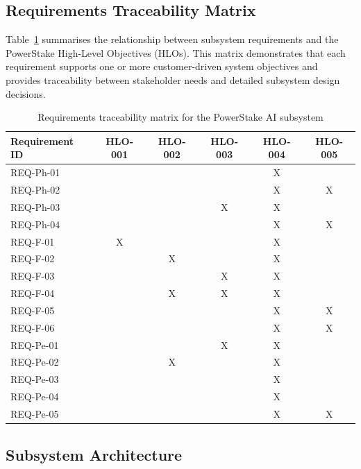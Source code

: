 \documentclass[11pt, twoside, a4paper]{article}
\begin{document}
\subsection{Requirements Traceability Matrix}

Table~\ref{tab:traceability} summarises the relationship between subsystem requirements and the PowerStake High-Level Objectives (HLOs). This matrix demonstrates that each requirement supports one or more customer-driven system objectives and provides traceability between stakeholder needs and detailed subsystem design decisions.

\begin{table}[H]
    \caption{Requirements traceability matrix for the PowerStake AI subsystem}
\centering
\renewcommand{\arraystretch}{1.15}
\begin{tabular}{|p{2.8cm}|c|c|c|c|c|}
\hline
\textbf{Requirement ID} & \textbf{HLO-001} & \textbf{HLO-002} & \textbf{HLO-003} & \textbf{HLO-004} & \textbf{HLO-005} \\ \hline
REQ-Ph-01 &  &  &  & X &  \\ \hline
REQ-Ph-02 &  &  &  & X & X \\ \hline
REQ-Ph-03 &  &  & X & X &  \\ \hline
REQ-Ph-04 &  &  &  & X & X \\ \hline
REQ-F-01  & X &  &  & X &  \\ \hline
REQ-F-02  &  & X &  & X &  \\ \hline
REQ-F-03  &  &  & X & X &  \\ \hline
REQ-F-04  &  & X & X & X &  \\ \hline
REQ-F-05  &  &  &  & X & X \\ \hline
REQ-F-06  &  &  &  & X & X \\ \hline
REQ-Pe-01 &  &  & X & X &  \\ \hline
REQ-Pe-02 &  & X &  & X &  \\ \hline
REQ-Pe-03 &  &  &  & X &  \\ \hline
REQ-Pe-04 &  &  &  & X &  \\ \hline
REQ-Pe-05 &  &  &  & X & X \\ \hline
\end{tabular}
\label{tab:traceability}
\end{table}


\subsection{Subsystem Architecture}
\end{document}
